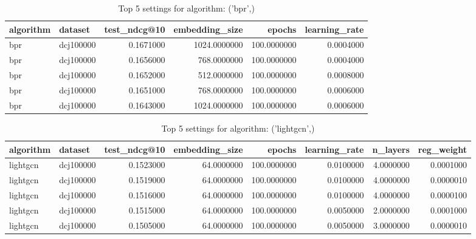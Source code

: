 \begin{table}
\caption{Top 5 settings for algorithm: ('bpr',)}
\label{tab:('bpr',)_top5}
\begin{tabular}{llrrrr}
\toprule
algorithm & dataset & test_ndcg@10 & embedding_size & epochs & learning_rate \\
\midrule
bpr & dcj100000 & 0.1671000 & 1024.0000000 & 100.0000000 & 0.0004000 \\
bpr & dcj100000 & 0.1656000 & 768.0000000 & 100.0000000 & 0.0004000 \\
bpr & dcj100000 & 0.1652000 & 512.0000000 & 100.0000000 & 0.0008000 \\
bpr & dcj100000 & 0.1651000 & 768.0000000 & 100.0000000 & 0.0006000 \\
bpr & dcj100000 & 0.1643000 & 1024.0000000 & 100.0000000 & 0.0006000 \\
\bottomrule
\end{tabular}
\end{table}


\begin{table}
\caption{Top 5 settings for algorithm: ('lightgcn',)}
\label{tab:('lightgcn',)_top5}
\begin{tabular}{llrrrrrr}
\toprule
algorithm & dataset & test_ndcg@10 & embedding_size & epochs & learning_rate & n_layers & reg_weight \\
\midrule
lightgcn & dcj100000 & 0.1523000 & 64.0000000 & 100.0000000 & 0.0100000 & 4.0000000 & 0.0001000 \\
lightgcn & dcj100000 & 0.1519000 & 64.0000000 & 100.0000000 & 0.0100000 & 4.0000000 & 0.0000010 \\
lightgcn & dcj100000 & 0.1516000 & 64.0000000 & 100.0000000 & 0.0100000 & 4.0000000 & 0.0000100 \\
lightgcn & dcj100000 & 0.1515000 & 64.0000000 & 100.0000000 & 0.0050000 & 2.0000000 & 0.0001000 \\
lightgcn & dcj100000 & 0.1505000 & 64.0000000 & 100.0000000 & 0.0050000 & 3.0000000 & 0.0000010 \\
\bottomrule
\end{tabular}
\end{table}


